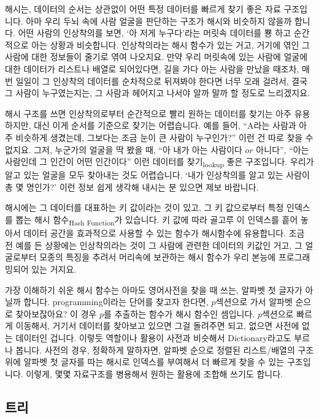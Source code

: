 \documentclass[11pt,a4paper]{article}
\newcommand{\sub}[1]{\textsubscript{#1}}
\begin{document}
해시는, 데이터의 순서는 상관없이 어떤 특정 데이터를 빠르게 찾기 좋은 자료 구조입니다. 아마 우리 두뇌 속에 사람 얼굴을 판단하는 구조가 해시와 비슷하지 않을까 합니다. 어떤 사람의 인상착의를 보면, `아 저게 누구다'라는 머릿속 데이터를 뿅 하고 순간적으로 아는 상황과 비슷합니다. 인상착의라는 해시 함수가 있는 거고, 거기에 엮인 그 사람에 대한 정보들이 줄기로 엮여 나오지요. 만약 우리 머릿속에 있는 사람에 얼굴에 대한 데이터가 리스트나 배열로 되어있다면, 길을 가다 아는 사람을 만났을 때조차, 매번 일일이 그 인상착의 데이터를 순차적으로 뒤져봐야 한다면 너무 오래 걸려서, 결국 그 사람이 누구였는지는, 그 사람과 헤어지고 나서야 알까 말까 할 정도로 느리겠지요.

해시 구조를 쓰면 인상착의로부터 순간적으로 빨리 원하는 데이터를 찾기는 아주 유용하지만, 대신 이게 순서를 기준으로 찾기는 어렵습니다. 예를 들어, ``A라는 사람과 아주 비슷하게 생겼는데, 그보다는 조금 눈이 큰 사람이 누구인가?'' 이런 건 따로 찾을 수 없지요. 그저, 누군가의 얼굴을 딱 봤을 때, ``아 내가 아는 사람이다 $or$ 아니다'', ``아는 사람인데 그 인간이 어떤 인간이다'' 이런 데이터를 찾기\sub{lookup} 좋은 구조입니다. 우리가 알고 있는 얼굴을 모두 찾아내는 것도 어렵습니다. `내가 인상착의를 알고 있는 사람이 총 몇 명인가?'  이런 정보 쉽게 생각해 내시는 분 있으면 제보 바랍니다.

해시에는 그 데이터를 대표하는 키 값이라는 것이 있고, 그 키 값으로부터 특정 인덱스를 뽑는 해시 함수\sub{Hash Function}가 있습니다. 키 값에 따라 골고루 이 인덱스를 흩어 놓아서 데이터 공간을 효과적으로 사용할 수 있는 함수가 해시함수에 유용합니다. 조금 전 예를 든 상황에는 인상착의라는 것이 그 사람에 관련한 데이터의 키값인 거고, 그 얼굴로부터 모종의 특징을 추려서 머리속에 보관하는 해시 함수가 우리 본능에 프로그래밍되어 있는 거지요.

가장 이해하기 쉬운 해시 함수는 아마도 영어사전을 찾을 때 쓰는, 알파벳 첫 글자가 아닐까 합니다. \textsf{programming}이라는 단어를 찾고자 한다면, $p$섹션으로 가서 알파벳 순으로 찾아보잖아요? 이 경우 $p$를 추출하는 함수가 해시 함수인 셈입니다. $p$섹션으로 빠르게 이동해서, 거기서 데이터를 찾아보고 있으면 그걸 돌려주면 되고, 없으면 사전에 없는 데이터인 겁니다. 이렇듯 역할이나 활용이 사전과 비슷해서 Dictionary라고도 부르나 봅니다. 사전의 경우, 정확하게 말하자면, 알파벳 순으로 정렬된 리스트/배열의 구조 위에 알파벳 첫 글자를 따는 해시로 인덱스를 부여해서 더 빠르게 찾을 수 있는 구조입니다. 이렇게, 몇몇 자료구조를 병용해서 원하는 활용에 조합해 쓰기도 합니다.

\subsection{트리}
\end{document}
